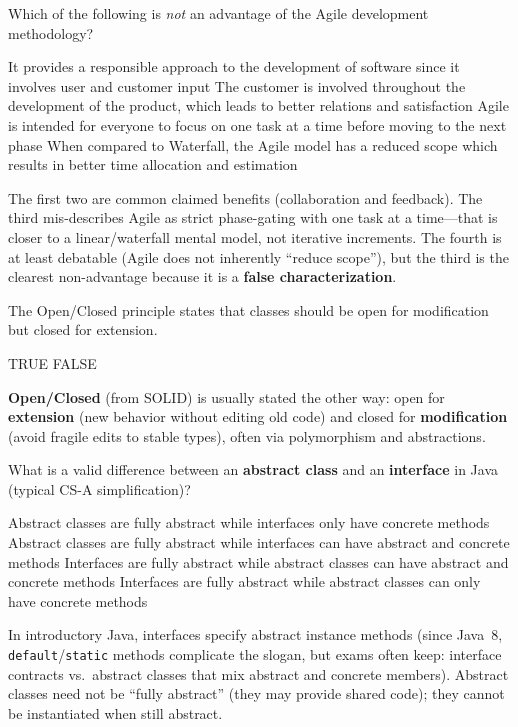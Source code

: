 \question[4]
Which of the following is \emph{not} an advantage of the Agile development methodology?
\begin{choices}
  \choice It provides a responsible approach to the development of software since it involves user and customer input
  \choice The customer is involved throughout the development of the product, which leads to better relations and satisfaction
  \CorrectChoice Agile is intended for everyone to focus on one task at a time before moving to the next phase
  \choice When compared to Waterfall, the Agile model has a reduced scope which results in better time allocation and estimation
\end{choices}
\begin{solution}
  The first two are common claimed benefits (collaboration and feedback). The third mis-describes Agile as strict phase-gating with one task at a time---that is closer to a linear/waterfall mental model, not iterative increments. The fourth is at least debatable (Agile does not inherently ``reduce scope''), but the third is the clearest non-advantage because it is a \textbf{false characterization}.
\end{solution}

\newpage


\question[4]
The Open/Closed principle states that classes should be open for modification but closed for extension.
\begin{choices}
  \choice TRUE
  \CorrectChoice FALSE
\end{choices}
\begin{solution}
  \textbf{Open/Closed} (from SOLID) is usually stated the other way: open for \textbf{extension} (new behavior without editing old code) and closed for \textbf{modification} (avoid fragile edits to stable types), often via polymorphism and abstractions.
\end{solution}

\question[4]
What is a valid difference between an \textbf{abstract class} and an \textbf{interface} in Java (typical CS-A simplification)?
\begin{choices}
  \choice Abstract classes are fully abstract while interfaces only have concrete methods
  \choice Abstract classes are fully abstract while interfaces can have abstract and concrete methods
  \CorrectChoice Interfaces are fully abstract while abstract classes can have abstract and concrete methods
  \choice Interfaces are fully abstract while abstract classes can only have concrete methods
\end{choices}
\begin{solution}
  In introductory Java, interfaces specify abstract instance methods (since Java~8, \texttt{default}/\texttt{static} methods complicate the slogan, but exams often keep: interface contracts vs.\ abstract classes that mix abstract and concrete members). Abstract classes need not be ``fully abstract'' (they may provide shared code); they cannot be instantiated when still abstract.
\end{solution}

